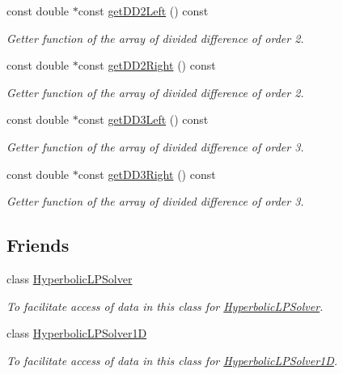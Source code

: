 \begin{DoxyCompactItemize}
const double $\ast$const \hyperlink{classParticleData_a4107cd3e039402131b9c1c2b161a950e}{get\-D\-D2\-Left} () const 
\begin{DoxyCompactList}\small\item\em Getter function of the array of divided difference of order 2. \end{DoxyCompactList}\item 
const double $\ast$const \hyperlink{classParticleData_afdf161e6bf7c6a6ef8f7dd47cf34d20d}{get\-D\-D2\-Right} () const 
\begin{DoxyCompactList}\small\item\em Getter function of the array of divided difference of order 2. \end{DoxyCompactList}\item 
const double $\ast$const \hyperlink{classParticleData_ad14c7643b2ef4a22bd717ee0353c5961}{get\-D\-D3\-Left} () const 
\begin{DoxyCompactList}\small\item\em Getter function of the array of divided difference of order 3. \end{DoxyCompactList}\item 
const double $\ast$const \hyperlink{classParticleData_a82f4135bd88853cf26a79e7050760df5}{get\-D\-D3\-Right} () const 
\begin{DoxyCompactList}\small\item\em Getter function of the array of divided difference of order 3. \end{DoxyCompactList}\end{DoxyCompactItemize}
\subsection*{Friends}
\begin{DoxyCompactItemize}
\item 
\hypertarget{classParticleData_a0085845c5573d5e5dd332dc5bab4ad17}{class \hyperlink{classParticleData_a0085845c5573d5e5dd332dc5bab4ad17}{Hyperbolic\-L\-P\-Solver}}\label{classParticleData_a0085845c5573d5e5dd332dc5bab4ad17}

\begin{DoxyCompactList}\small\item\em To facilitate access of data in this class for \hyperlink{classHyperbolicLPSolver}{Hyperbolic\-L\-P\-Solver}. \end{DoxyCompactList}\item 
\hypertarget{classParticleData_a37d38b9c8eb8b119aea3e7cc1b0b6373}{class \hyperlink{classParticleData_a37d38b9c8eb8b119aea3e7cc1b0b6373}{Hyperbolic\-L\-P\-Solver1\-D}}\label{classParticleData_a37d38b9c8eb8b119aea3e7cc1b0b6373}

\begin{DoxyCompactList}\small\item\em To facilitate access of data in this class for \hyperlink{classHyperbolicLPSolver1D}{Hyperbolic\-L\-P\-Solver1\-D}. \end{DoxyCompactList}\end{DoxyCompactItemize}


